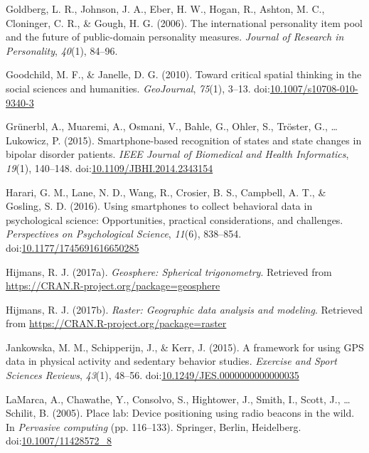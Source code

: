 \documentclass[man]{apa6}
\theoremstyle{definition}
\theoremstyle{definition}
\theoremstyle{definition}
\theoremstyle{remark}
\begin{document}
\hypertarget{ref-goldberg_international_2006}{}
Goldberg, L. R., Johnson, J. A., Eber, H. W., Hogan, R., Ashton, M. C.,
Cloninger, C. R., \& Gough, H. G. (2006). The international personality
item pool and the future of public-domain personality measures.
\emph{Journal of Research in Personality}, \emph{40}(1), 84--96.

\hypertarget{ref-goodchild_toward_2010}{}
Goodchild, M. F., \& Janelle, D. G. (2010). Toward critical spatial
thinking in the social sciences and humanities. \emph{GeoJournal},
\emph{75}(1), 3--13.
doi:\href{https://doi.org/10.1007/s10708-010-9340-3}{10.1007/s10708-010-9340-3}

\hypertarget{ref-grunerbl_smartphone-based_2015}{}
Grünerbl, A., Muaremi, A., Osmani, V., Bahle, G., Ohler, S., Tröster,
G., \ldots{} Lukowicz, P. (2015). Smartphone-based recognition of states
and state changes in bipolar disorder patients. \emph{IEEE Journal of
Biomedical and Health Informatics}, \emph{19}(1), 140--148.
doi:\href{https://doi.org/10.1109/JBHI.2014.2343154}{10.1109/JBHI.2014.2343154}

\hypertarget{ref-harari_using_2016}{}
Harari, G. M., Lane, N. D., Wang, R., Crosier, B. S., Campbell, A. T.,
\& Gosling, S. D. (2016). Using smartphones to collect behavioral data
in psychological science: Opportunities, practical considerations, and
challenges. \emph{Perspectives on Psychological Science}, \emph{11}(6),
838--854.
doi:\href{https://doi.org/10.1177/1745691616650285}{10.1177/1745691616650285}

\hypertarget{ref-R-geosphere}{}
Hijmans, R. J. (2017a). \emph{Geosphere: Spherical trigonometry}.
Retrieved from \url{https://CRAN.R-project.org/package=geosphere}

\hypertarget{ref-R-raster}{}
Hijmans, R. J. (2017b). \emph{Raster: Geographic data analysis and
modeling}. Retrieved from
\url{https://CRAN.R-project.org/package=raster}

\hypertarget{ref-jankowska_framework_2015}{}
Jankowska, M. M., Schipperijn, J., \& Kerr, J. (2015). A framework for
using GPS data in physical activity and sedentary behavior studies.
\emph{Exercise and Sport Sciences Reviews}, \emph{43}(1), 48--56.
doi:\href{https://doi.org/10.1249/JES.0000000000000035}{10.1249/JES.0000000000000035}

\hypertarget{ref-lamarca_place_2005}{}
LaMarca, A., Chawathe, Y., Consolvo, S., Hightower, J., Smith, I.,
Scott, J., \ldots{} Schilit, B. (2005). Place lab: Device positioning
using radio beacons in the wild. In \emph{Pervasive computing} (pp.
116--133). Springer, Berlin, Heidelberg.
doi:\href{https://doi.org/10.1007/11428572_8}{10.1007/11428572\_8}
\end{document}
